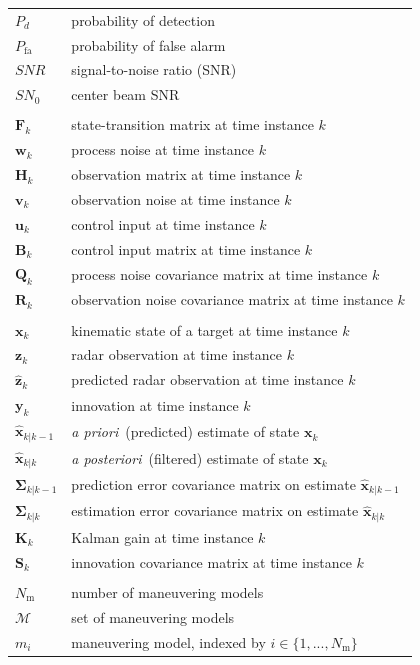 \documentclass[english, 12pt, a4paper, elec, utf8, a-1b, online]{aaltothesis}
\numberwithin{equation}{section}
\renewcommand{\vec}[1]{\mathbf{#1}}
\newcommand{\xprior}{\hat{\vec{x}}_{k|k-1}}
\newcommand{\xpost}{\hat{\vec{x}}_{k|k}}
\newcommand{\priorecov}{\boldsymbol{\Sigma}_{k|k-1}}
\newcommand{\postecov}{\boldsymbol{\Sigma}_{k|k}}
\newcommand{\prefitinnov}{\vec{y}_k}
\newcommand{\x}{\vec{x}_k}
\newcommand{\z}{\vec{z}_k}
\newcommand{\stmodel}{\vec{F}_k}
\newcommand{\cimodel}{\vec{B}_k}
\newcommand{\cinput}{\vec{u}_k}
\newcommand{\pnoise}{\vec{w}_k}
\newcommand{\omodel}{\vec{H}_k}
\newcommand{\onoise}{\vec{v}_k}
\newcommand{\ocov}{\vec{R}_k}
\newcommand{\pcov}{\vec{Q}_k}
\newcommand{\innocov}{\vec{S}_k}
\newcommand{\gain}{\vec{K}_k}
\def\prior{\textit{a priori}\ }
\def\post{\textit{a posteriori}\ }
\newcommand{\zhat}{\hat{\vec{z}}_k}
\newcommand{\mimm}{\mathcal{M}}
\newcommand{\nmodels}{{N_\text{m}}}
\begin{document}
\begin{longtable}{ll}
$P_d$ & probability of detection \\
$P_\text{fa}$ & probability of false alarm \\
$SNR$ & signal-to-noise ratio (SNR) \\
$SN_0$ & center beam SNR \\
&\\
$\stmodel$ & state-transition matrix at time instance $k$\\
$\pnoise$ & process noise at time instance $k$\\
$\omodel$ & observation matrix at time instance $k$\\
$\onoise$ & observation noise at time instance $k$\\
$\cinput$ & control input at time instance $k$\\
$\cimodel$ & control input matrix at time instance $k$\\
$\pcov$ & process noise covariance matrix at time instance $k$\\
$\ocov$ & observation noise covariance matrix at time instance $k$\\
&\\
$\x$ & kinematic state of a target at time instance $k$ \\
$\z$ & radar observation at time instance $k$ \\
$\zhat$ & predicted radar observation at time instance $k$ \\
$\prefitinnov$ & innovation at time instance $k$ \\
$\xprior$ & \prior (predicted) estimate of state $\x$\\
$\xpost$ & \post (filtered) estimate of state $\x$ \\
$\priorecov$ & prediction error covariance matrix on estimate $\xprior$ \\
$\postecov$ & estimation error covariance matrix on estimate $\xpost$ \\
$\gain$ & Kalman gain at time instance $k$ \\
$\innocov$ & innovation covariance matrix at time instance $k$ \\
&\\
$\nmodels$ & number of maneuvering models \\
$\mimm$ & set of maneuvering models \\
$m_i$ & maneuvering model, indexed by $i \in \{1, ..., \nmodels\}$ \\

\end{longtable}
\end{document}
